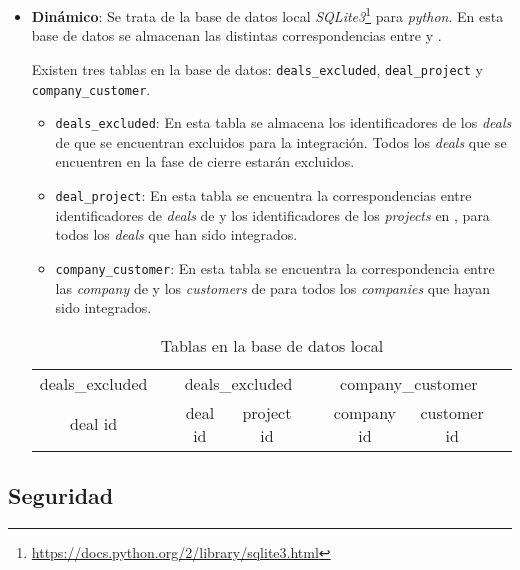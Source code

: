 \begin{itemize}[leftmargin=*]
\item \textbf{Dinámico}: Se trata de la base de datos local \textit{SQLite3}\footnote{\url{https://docs.python.org/2/library/sqlite3.html}} para \textit{python}. %
 En esta base de datos se almacenan las distintas correspondencias entre \hs{} y \wday.
 
 Existen tres tablas en la base de datos: \texttt{deals\_excluded}, \texttt{deal\_project} y \texttt{company\_customer}.
 
 
 \begin{itemize}
	\item \texttt{deals\_excluded}: En esta tabla se almacena los identificadores de los \textit{deals} de \hs{} 
	que se encuentran excluidos para la integración. Todos los \textit{deals} que se encuentren en la fase de
	cierre estarán excluidos.
	\item \texttt{deal\_project}: En esta tabla se encuentra la correspondencias entre identificadores 
	de \textit{deals} de \hs{} y los identificadores de los \textit{projects} en \wday{}, para todos los \textit{deals} que han sido integrados.
	\item \texttt{company\_customer}: En esta tabla se encuentra la correspondencia entre las \textit{company} de \hs{} y los \textit{customers} de \wday{}
	para todos los \textit{companies} que hayan sido integrados.
 \end{itemize}
 

\begin{table}[H]
		\centering
		\begin{tabular}{
		|c|c@{\hskip 1cm} 
		|c|c|c@{\hskip 1cm} 
		|c|c|c@{\hskip 1cm}
		}
		\cline{1-1}\cline{3-4}\cline{6-7}
		deals\_excluded && \multicolumn{2}{c|}{deals\_excluded} && \multicolumn{2}{c|}{company\_customer} \\
	\cline{1-1}\cline{3-4}\cline{6-7}
	deal id && deal id & project id && company id & customer id \\
	\cline{1-1}\cline{3-4}\cline{6-7}
	\end{tabular}
	\caption{Tablas en la base de datos local}
	\label{tab:tables}
\end{table}

\end{itemize}




\subsection{Seguridad}
\label{subsec:security}

